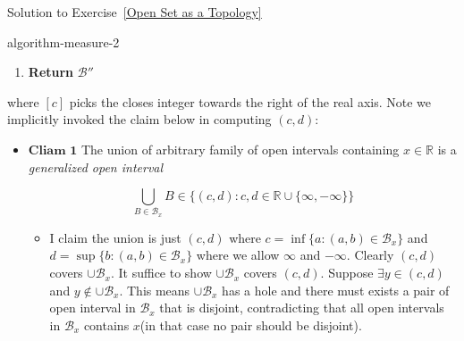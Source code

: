 \begin{mystsolution}{Solution to Exercise~\ref{Open Set as a Topology}}
\begin{mystthmalgorithm}{}{algorithm-measure-2}
\begin{enumerate}
\begin{enumerate}
\item Compute $(c,d)=\bigcup_{B\in \mathcal B_x} B$ where $c,d$ is in extended real number system.
\item \textbf{If} $c,d\in \mathbb{R}$:

\begin{enumerate}
\item $\mathcal{B}_x'=\{(c,d)\}$
\end{enumerate}


\item \textbf{Else if} $c\in \mathbb{R}, d=\infty$:

\begin{enumerate}
\item $\mathcal{B}_x'\gets \{(c,[c])\}\cup \{[c],[c]+j\}_{j=1}^{\infty}$
\end{enumerate}


\item \textbf{Else}
Other cases follows as (3)
\item $\mathcal B'' = \mathcal B'' \cup \mathcal B_x '$
\end{enumerate}


\item \textbf{Return} $\mathcal B''$
\end{enumerate}

\end{mystthmalgorithm}
where $[c]$ picks the closes integer towards the right of the real axis.
Note we implicitly invoked the claim below in computing $(c,d)$:

\begin{itemize}
\item $\boxed{\textbf{Cliam 1}}$ The union of arbitrary family of open intervals containing $x\in \mathbb{R}$ is a \textit{generalized open interval}

\begin{equation}
\bigcup_{B\in \mathcal B_x} B\in \{(c,d): c,d\in \mathbb{R}\cup \{\infty, -\infty\}\}
\end{equation}

\begin{itemize}
\item I claim the union is just $(c,d)$ where $c=\inf \{a:(a,b)\in \mathcal B_x\}$ and $d=\sup \{b:(a,b)\in \mathcal B_x\}$ where we allow $\infty$ and $-\infty$. Clearly $(c,d)$ covers $\cup \mathcal B_x$. It suffice to show $\cup \mathcal B_x$ covers $(c,d)$. Suppose $\exists y \in (c,d)$ and $y\notin \cup \mathcal B_x$. This means $\cup \mathcal B_x$ has a hole and there must exists a pair of open interval in $\mathcal B_x$ that is disjoint, contradicting that all open intervals in $\mathcal B_x$ contains $x$(in that case no pair should be disjoint).
\end{itemize}
\end{itemize}


\end{mystsolution}
